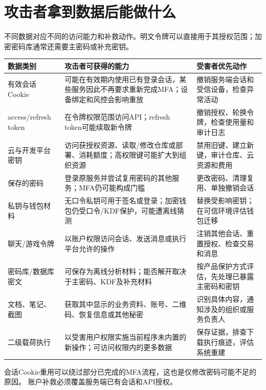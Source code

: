\documentclass[UTF8,a4paper,zihao=5,fontset=windows]{ctexart}
\begin{document}
\section{攻击者拿到数据后能做什么}
\label{sec:impact}
不同数据对应不同的访问能力和补救动作。明文令牌可以直接用于其授权范围；加密密码库通常还需要主密码或补充密钥。
\begin{longtable}{@{}L{29mm}L{72mm}L{49mm}@{}}\toprule 数据类别 & 攻击者可获得的能力 & 受害者优先动作\\\midrule\endhead
有效会话Cookie & 可能在有效期内使用已有登录会话，某些服务因此不再要求重新完成MFA；设备绑定和风控会影响重放 & 撤销服务端会话和受信设备，检查异常活动\\
access/refresh token & 在令牌权限范围访问API；refresh token可能续取新令牌 & 撤销授权、轮换令牌，检查使用量和审计日志\\
云与开发平台密钥 & 访问获授权资源、读取/修改仓库或部署、消耗额度；高权限键可能扩大到组织资源 & 禁用旧键、建立新键，审计仓库、云资源和费用\\
保存的密码 & 登录原服务并尝试复用密码的其他服务；MFA仍可能构成门槛 & 更改密码、清理复用、单独撤销会话\\
私钥与钱包材料 & 无口令私钥可用于签名或登录；加密钱包仍受口令/KDF保护，可能遭离线猜测 & 替换受影响密钥；在可信环境评估钱包迁移\\
聊天/游戏令牌 & 以账户权限访问会话、发送消息或执行平台允许的操作 & 注销其他会话、重置授权、检查交易和消息\\
密码库/数据库密文 & 可保存为离线分析材料；能否解开取决于主密码、KDF及补充材料 & 按产品保护方式评估，先处理已暴露主密码和密钥\\
文档、笔记、截图 & 获取其中显示的业务资料、账号、二维码、恢复信息或其他秘密 & 识别具体内容，通知涉及的组织或服务负责人\\
二级载荷执行 & 以受害用户权限实施当前程序未内置的新操作；可访问权限内的更多数据 & 保存证据，排查下载执行痕迹，评估系统重建\\\bottomrule\end{longtable}

会话Cookie重用可以绕过部分已完成的MFA流程，这也是仅修改密码可能不足的原因。\cite{sessioncookie} 账户补救必须覆盖服务端已有会话和API授权。
\end{document}
